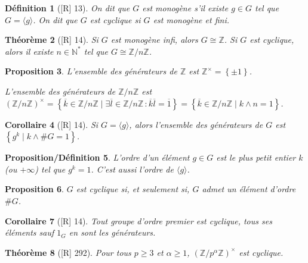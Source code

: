 \documentclass[10pt, a4paper, parskip=full, twoside, twocolumn]{report}
\newtheorem{definition}{Définition}
\newtheorem{theorem}[definition]{Théorème}
\newtheorem{proposition}[definition]{Proposition}
\newtheorem{proposition_def}[definition]{Proposition/Définition}
\newtheorem{corollary}[definition]{Corollaire}
\newcommand{\IN}{\mathbb{N}}
\newcommand{\IZ}{\mathbb{Z}}
\newcommand{\IZnZ}{\mathbb{Z}/n\mathbb{Z}}
\begin{document}
\begin{definition}[\textnormal{[R] 13}]
	On dit que $G$ est \emph{monogène} s'il existe $g\in G$ tel que $G = \langle g \rangle$.
	On dit que $G$ est \emph{cyclique} si $G$ est monogène et fini.
\end{definition}

\begin{theorem}[\textnormal{[R] 14}]
	Si $G$ est monogène infi, alors $G\cong \IZ$. Si $G$ est cyclique, alors il existe $n\in \IN^*$ tel que $G\cong \IZnZ$.
\end{theorem}

\begin{proposition}
	L'ensemble des générateurs de $\IZ$ est $\IZ^{\times} = \left\{\pm 1\right\}$.

	L'ensemble des générateurs de $\IZnZ$ est $\left(\IZnZ\right)^{\times} = \left\{\overline{k}\in \IZnZ\mid \exists \overline{l}\in\IZnZ\,\colon \overline{k}\overline{l} = \overline{1}\right\} = \left\{\overline{k}\in\IZnZ \mid k\wedge n = 1\right\}$.
\end{proposition}

\begin{corollary}[\textnormal{[R] 14}]
	Si $G=\langle g\rangle$, alors l'ensemble des générateurs de $G$ est $\left\{g^k\mid k\wedge \# G = 1\right\}$.
\end{corollary}

\begin{proposition_def}
	L'\emph{ordre} d'un élément $g\in G$ est le plus petit entier $k$ (ou $+\infty$) tel que $g^k = 1$. C'est aussi l'ordre de $\langle g\rangle$.
\end{proposition_def}

\begin{proposition}
	$G$ est cyclique si, et seulement si, $G$ admet un élément d'ordre $\# G$.
\end{proposition}

\begin{corollary}[\textnormal{[R] 14}]
	Tout groupe d'ordre premier est cyclique, tous ses éléments sauf $1_G$ en sont les générateurs.
\end{corollary}


\begin{tcolorbox}[
    breakable, %
    colback=developpement, %
    colframe=gray!0!black, %
    boxrule=0pt, %
    arc=1mm, %
	boxsep=0pt,
	left=0pt, right=0pt, top=0pt, bottom=0pt
]
\begin{theorem}[\textnormal{[R] 292}]
	\label{108dev1}
	Pour tous $p\geq 3$ et $\alpha\geq 1$, $\left(\IZ/p^{\alpha}\IZ\right)^{\times}$ est cyclique.
\end{theorem}
\end{tcolorbox}
\end{document}
